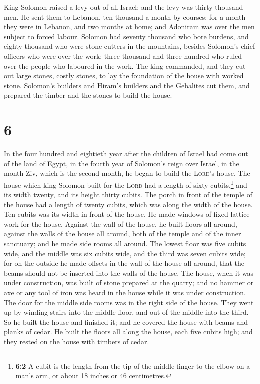  King Solomon raised a levy out of all Israel; and the
levy was thirty thousand men.  He sent them to Lebanon,
ten thousand a month by courses: for a month they were in Lebanon, and
two months at home; and Adoniram was over the men subject to forced
labour.  Solomon had seventy thousand who bore burdens,
and eighty thousand who were stone cutters in the mountains,
 besides Solomon's chief officers who were over the work:
three thousand and three hundred who ruled over the people who laboured
in the work.  The king commanded, and they cut out large
stones, costly stones, to lay the foundation of the house with worked
stone.  Solomon's builders and Hiram's builders and the
Gebalites cut them, and prepared the timber and the stones to build the
house.

\hypertarget{section-5}{%
\section{6}\label{section-5}}

 In the four hundred and eightieth year after the children
of Israel had come out of the land of Egypt, in the fourth year of
Solomon's reign over Israel, in the month Ziv, which is the second
month, he began to build the \textsc{Lord}'s house.  The
house which king Solomon built for the \textsc{Lord} had a length of
sixty cubits,\footnote{\textbf{6:2} A cubit is the length from the tip
  of the middle finger to the elbow on a man's arm, or about 18 inches
  or 46 centimetres.} and its width twenty, and its height thirty
cubits.  The porch in front of the temple of the house had
a length of twenty cubits, which was along the width of the house. Ten
cubits was its width in front of the house.  He made
windows of fixed lattice work for the house.  Against the
wall of the house, he built floors all around, against the walls of the
house all around, both of the temple and of the inner sanctuary; and he
made side rooms all around.  The lowest floor was five
cubits wide, and the middle was six cubits wide, and the third was seven
cubits wide; for on the outside he made offsets in the wall of the house
all around, that the beams should not be inserted into the walls of the
house.  The house, when it was under construction, was
built of stone prepared at the quarry; and no hammer or axe or any tool
of iron was heard in the house while it was under construction.
 The door for the middle side rooms was in the right side
of the house. They went up by winding stairs into the middle floor, and
out of the middle into the third.  So he built the house
and finished it; and he covered the house with beams and planks of
cedar.  He built the floors all along the house, each
five cubits high; and they rested on the house with timbers of cedar.

